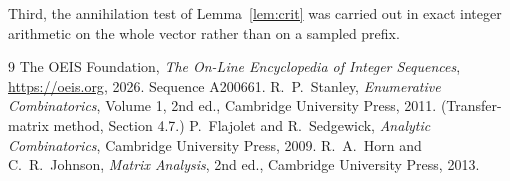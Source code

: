 \documentclass[11pt,a4paper]{article}
\theoremstyle{plain}
\theoremstyle{definition}
\begin{document}
Third, the annihilation test of Lemma~\ref{lem:crit} was carried out in exact integer
arithmetic on the whole vector rather than on a sampled prefix.

\begin{thebibliography}{9}
 The OEIS Foundation, \emph{The On-Line Encyclopedia of Integer
Sequences}, \url{https://oeis.org}, 2026. Sequence A200661.
 R.~P.~Stanley, \emph{Enumerative Combinatorics}, Volume 1, 2nd ed.,
Cambridge University Press, 2011. (Transfer-matrix method, Section 4.7.)
 P.~Flajolet and R.~Sedgewick, \emph{Analytic Combinatorics}, Cambridge
University Press, 2009.
 R.~A.~Horn and C.~R.~Johnson, \emph{Matrix Analysis}, 2nd ed., Cambridge
University Press, 2013.
\end{thebibliography}
\end{document}
